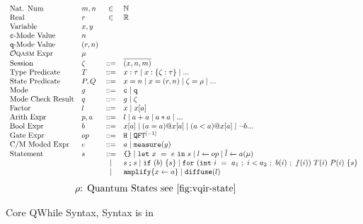 \begin{figure}[t]
{
  \small
  \[\begin{array}{llcl} 
      \text{Nat. Num} & m, n & \in & \mathbb{N}       \\
      \text{Real} & r & \in & \mathbb{R}\\
      \text{Variable} & x,y \\
      \text{\cmode-Mode Value} & n\\
      \text{\qmode-Mode Value} & (r,n)\\
      \text{\oqasm Expr} & \mu\\
      \text{Session} & \zeta & ::= & \overline{(x,n,m)} \\
      \text{Type Predicate} & T & ::= & x:\tau  \mid x:\{\zeta:\tau\} \mid ...\\
      \text{State Predicate} & P,Q & ::= & x=n\mid x=(r,n)  \mid \zeta=\rho \mid ...\\
      \text{Mode} & g & ::= & \cmode  \mid \qmode\\
      \text{Mode Check Result} & q & ::= & g  \mid \zeta\\
      \text{Factor} & l & ::= & x \mid x[a] \\
      \text{Arith Expr} & p,a & ::= & l \mid a + a \mid a * a \mid ... \\
      \text{Bool Expr} & b & ::= & x[a] \mid (a = a) @ x[a] \mid (a < a) @ x[a] \mid \neg b  ... \\
      \text{Gate Expr} & op & ::= & \texttt{H} \mid \iqft[\lbrack -1 \rbrack]{}{} \\
      \text{C/M Moded Expr}& e & ::= & a \mid \smea{y}  \\
      \text{Statement} & s & ::= & \sskip \mid \sexp{x}{e}{s} \mid  \ssassign{l}{}{op} \mid \ssassign{\overline{l}}{}{a(\mu)} 
                                 \\ & & \mid & \sseq{s}{s} \mid \sifq{b}{s} \mid
                                     \sqwhile{\sinit{i}{a_1}}{i<a_2}{b(i)}{f(i)}{T(i)}{P(i)}{s}
                     \\&&\mid & \samplify{\ssassign{x}{}{a}}
                      \mid \sdistr{l}
    \end{array}
  \]
}
{\footnotesize
\[
\begin{array}{l}
\rho \text{: Quantum States see \Cref{fig:vqir-state}}
\end{array}
\]
}
  \caption{Core QWhile Syntax, \oqasm Syntax is in }
  \label{fig:vqimp}
\end{figure}

